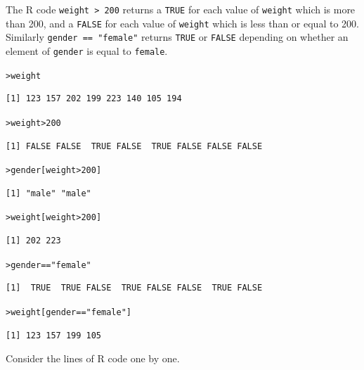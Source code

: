 \documentclass[12pt,oneside]{book}\usepackage[]{graphicx}\usepackage[]{color}
\makeatletter
\newcommand{\hlnum}[1]{\textcolor[rgb]{0.686,0.059,0.569}{#1}}%
\newcommand{\hlstr}[1]{\textcolor[rgb]{0.192,0.494,0.8}{#1}}%
\newcommand{\hlopt}[1]{\textcolor[rgb]{0,0,0}{#1}}%
\newcommand{\hlstd}[1]{\textcolor[rgb]{0.345,0.345,0.345}{#1}}%
\newenvironment{kframe}{%
 \def\at@end@of@kframe{}%
 \ifinner\ifhmode%
  \def\at@end@of@kframe{\end{minipage}}%
  \begin{minipage}{\columnwidth}%
 \fi\fi%
 \def\FrameCommand##1{\hskip\@totalleftmargin \hskip-\fboxsep
 \colorbox{shadecolor}{##1}\hskip-\fboxsep
     \hskip-\linewidth \hskip-\@totalleftmargin \hskip\columnwidth}%
 \MakeFramed {\advance\hsize-\width
   \@totalleftmargin\z@ \linewidth\hsize
   \@setminipage}}%
 {\par\unskip\endMakeFramed%
 \at@end@of@kframe}
\newenvironment{knitrout}{}{} %
\makeatother
\begin{document}
The R code \verb+weight > 200+ returns a \verb+TRUE+ for each value of \verb+weight+ which is more than 200, and a \verb+FALSE+ for each value of \verb+weight+ which is less than or equal to 200. Similarly \verb+gender == "female"+ returns \verb+TRUE+ or \verb+FALSE+ depending on whether an element of \verb+gender+ is equal to \verb+female+.
\begin{knitrout}
\color{fgcolor}\begin{kframe}
\begin{alltt}
\hlstd{> }\hlstd{weight}
\end{alltt}
\begin{verbatim}
[1] 123 157 202 199 223 140 105 194
\end{verbatim}
\begin{alltt}
\hlstd{> }\hlstd{weight} \hlopt{>} \hlnum{200}
\end{alltt}
\begin{verbatim}
[1] FALSE FALSE  TRUE FALSE  TRUE FALSE FALSE FALSE
\end{verbatim}
\begin{alltt}
\hlstd{> }\hlstd{gender[weight} \hlopt{>} \hlnum{200}\hlstd{]}
\end{alltt}
\begin{verbatim}
[1] "male" "male"
\end{verbatim}
\begin{alltt}
\hlstd{> }\hlstd{weight[weight} \hlopt{>} \hlnum{200}\hlstd{]}
\end{alltt}
\begin{verbatim}
[1] 202 223
\end{verbatim}
\begin{alltt}
\hlstd{> }\hlstd{gender} \hlopt{==} \hlstr{"female"}
\end{alltt}
\begin{verbatim}
[1]  TRUE  TRUE FALSE  TRUE FALSE FALSE  TRUE FALSE
\end{verbatim}
\begin{alltt}
\hlstd{> }\hlstd{weight[gender} \hlopt{==} \hlstr{"female"}\hlstd{]}
\end{alltt}
\begin{verbatim}
[1] 123 157 199 105
\end{verbatim}
\end{kframe}
\end{knitrout}
Consider the lines of R code one by one.
\end{document}
